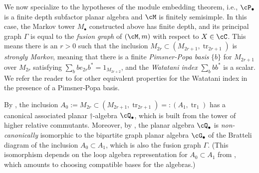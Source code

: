 \documentclass[11pt]{article}
\theoremstyle{plain}
\theoremstyle{definition}
\DeclareMathOperator{\tr}{tr}
\begin{document}

We now specialize to the hypotheses of the module embedding theorem, i.e., $\cP_\bullet$ is a finite depth subfactor planar algebra and $\cM$ is finitely semisimple.
In this case, the Markov tower $M_\bullet$ constructed above has finite depth, and its principal graph $\Gamma$ is equal to the \emph{fusion graph} of $(\cM,m)$ with respect to $X\in \cC$.
This means there is an $r>0$ such that the inclusion $M_{2r} \subset (M_{2r+1}, \tr_{2r+1})$ is \emph{strongly Markov}, meaning that there is a finite \emph{Pimsner-Popa basis} $\{b\}$ for $M_{2r+1}$ over $M_{2r}$ satisfying $\sum_b be_{2r} b^* = 1_{M_{2r+2}}$, and the \emph{Watatani index} $\sum_b bb^*$ \cite{MR996807} is a scalar.
We refer the reader to \cite[1.1.4(c)]{MR1278111} for other equivalent properties for the Watatani index in the presence of a Pimsner-Popa basis. 

By \cite[\S2.3]{MR2812459}, the inclusion $A_0:=M_{2r} \subset (M_{2r+1}, \tr_{2r+1}) =: (A_1, \tr_1)$ has a canonical associated planar $\dag$-algebra $\cQ_\bullet$, which is built from the tower of higher relative commutants.
Moreover, by \cite[Thm.~3.8]{MR2812459}, the planar algebra $\cQ_\bullet$ is \emph{non-canonically} isomorphic to the bipartite graph planar algebra $\cG_\bullet$ of the Bratteli diagram of the inclusion $A_0 \subset A_1$, which is also the fusion graph $\Gamma$. 
(This isomorphism depends on the loop algebra representation for $A_0 \subset A_1$ from \cite[\S3.1]{MR2812459}, which amounts to choosing compatible bases for the algebras.)
\end{document}
